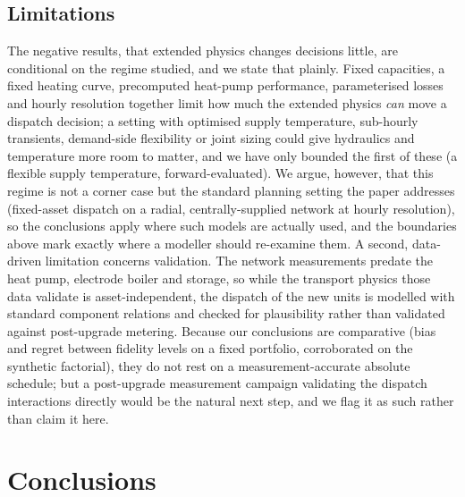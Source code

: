 \documentclass[a4paper,fleqn]{cas-sc}
\newcommand{\new}[1]{\textcolor[HTML]{1A5FB4}{#1}}   %
\newcommand{\new}[1]{#1}
\begin{document}
\subsection{Limitations}
The negative results, that extended physics changes decisions little, are conditional on
the regime studied, and we state that plainly. Fixed capacities, a fixed heating curve,
precomputed heat-pump performance, parameterised losses and hourly resolution together limit how
much the extended physics \emph{can} move a dispatch decision; a setting with optimised supply
temperature, sub-hourly transients, demand-side flexibility or joint sizing could give hydraulics
and temperature more room to matter, and we have only bounded the first of these (a flexible
supply temperature, forward-evaluated). We argue, however, that this regime is not a corner case
but the standard planning setting the paper addresses (fixed-asset dispatch on a radial,
centrally-supplied network at hourly resolution), so the conclusions apply where such models are
actually used, and the boundaries above mark exactly where a modeller should re-examine them.
A second, data-driven limitation concerns validation. The network measurements predate the heat
pump, electrode boiler and storage, so while the transport physics those data validate is
asset-independent, the dispatch of the new units is modelled with standard component relations
and checked for plausibility rather than validated against post-upgrade metering. Because our
conclusions are comparative (bias and regret between fidelity levels on a fixed portfolio,
corroborated on the synthetic factorial), they do not rest on a measurement-accurate absolute
schedule; but a post-upgrade measurement campaign validating the dispatch interactions directly
would be the natural next step, and we flag it as such rather than claim it here.
\new{}

\section{Conclusions}\label{sec:conclusion}
\new{}
\end{document}
